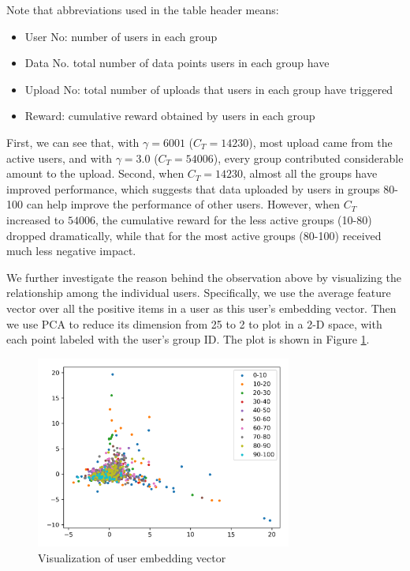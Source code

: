 \noindent Note that abbreviations used in the table header means:
\begin{itemize}[noitemsep]
    \item User No: number of users in each group
    \item Data No. total number of data points users in each group have
    \item Upload No: total number of uploads that users in each group have triggered
    \item Reward: cumulative reward obtained by users in each group
\end{itemize}
First, we can see that, with $\gamma=6001$ ($C_{T}=14230$), most upload came from the active users, and with $\gamma=3.0$ ($C_{T}=54006$), every group contributed considerable amount to the upload. Second, when $C_{T}=14230$, almost all the groups have improved performance, which suggests that data uploaded by users in groups 80-100 can help improve the performance of other users. However, when $C_{T}$ increased to $54006$, the cumulative reward for the less active groups (10-80) dropped dramatically, while that for the most active groups (80-100) received much less negative impact. 

We further investigate the reason behind the observation above by visualizing the relationship among the individual users. Specifically, we use the average feature vector over all the positive items in a user as this user’s embedding vector. Then we use PCA to reduce its dimension from 25 to 2 to plot in a 2-D space, with each point labeled with the user’s group ID. The plot is shown in Figure \ref{fig:user_embedding_visualization}.

\begin{figure}[ht]
    \centering
    \includegraphics[width=0.75\textwidth]{imgs/visualization_pca.png}
    \caption{Visualization of user embedding vector}
    \label{fig:user_embedding_visualization}
\end{figure}

